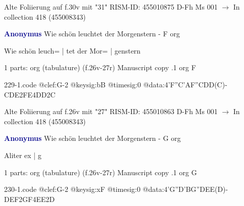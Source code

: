 \documentclass[twocolumn]{book}
\begin{document}
\newline Alte Foliierung auf f.30v mit "31"
\newline RISM-ID: 455010875
\newline D-Fh  Ms 001
\newline $\rightarrow$ In collection 418 (455008343)
      
\newline \par \vspace{7pt} \textcolor{darkblue}{\textbf{Anonymus  }}
\newline Wie schön leuchtet der Morgenstern - F
\newline org
\newline \begin{itshape}[f.26v, at left:] Wie schön leuch= | tet der Mor= | genstern\end{itshape} 
\newline \textcolor{darkblue}{}  1 parts: org (tabulature)  (f.26v-27r)
\newline Manuscript copy
.1  org  F  
\begin{filecontents*}{229-1.code}
@clef:G-2
@keysig:bB
@timesig:0
@data:4'F''C'AF''CDD(C)-CDE2FE4DD2C
\end{filecontents*}
\newline
%

\newline Alte Foliierung auf f.26v mit "27"
\newline RISM-ID: 455010863
\newline D-Fh  Ms 001
\newline $\rightarrow$ In collection 418 (455008343)
      
\newline \par \vspace{7pt} \textcolor{darkblue}{\textbf{Anonymus  }}
\newline Wie schön leuchtet der Morgenstern - G
\newline org
\newline \begin{itshape}[f.26v, at left:] Aliter ex | g\end{itshape} 
\newline \textcolor{darkblue}{}  1 parts: org (tabulature)  (f.26v-27r)
\newline Manuscript copy
.1  org  G  
\begin{filecontents*}{230-1.code}
@clef:G-2
@keysig:xF
@timesig:0
@data:4'G''D'BG''DEE(D)-DEF2GF4EE2D
\end{filecontents*}
\newline
%
\end{document}
